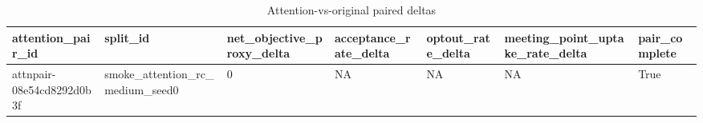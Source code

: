 \begin{table}[ht]
\centering
\begin{tabular}{lllllll}
 \hline
attention\_pair\_id & split\_id & net\_objective\_proxy\_delta & acceptance\_rate\_delta & optout\_rate\_delta & meeting\_point\_uptake\_rate\_delta & pair\_complete \\
 \hline
attnpair-08e54cd8292d0b3f & smoke\_attention\_rc\_medium\_seed0 & 0 & NA & NA & NA & True \\
 \hline
\end{tabular}
\caption{Attention-vs-original paired deltas}
\end{table}
